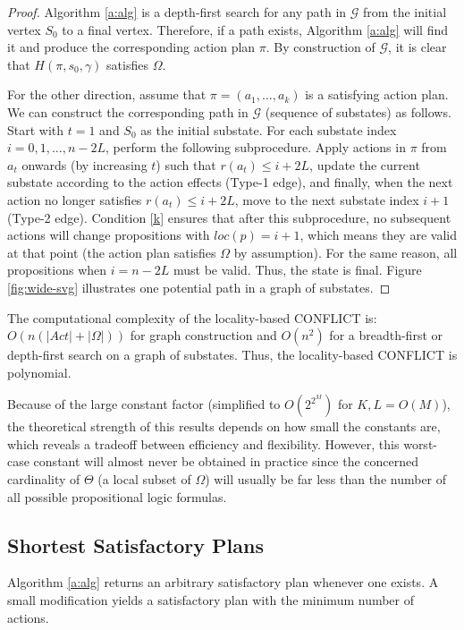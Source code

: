 \documentclass[]{jair}
\begin{document}
\begin{proof}{}
Algorithm \ref{a:alg} is a depth-first search for any path in $\mathcal{G}$ from the initial vertex $S_0$ to a final vertex. Therefore, if a path exists, Algorithm \ref{a:alg} will find it and produce the corresponding action plan $\pi$. By construction of $\mathcal{G}$, it is clear that $H(\pi, s_0, \gamma)$ satisfies $\Omega$.

For the other direction, assume that $\pi=(a_1,\dots,a_k)$ is a satisfying action plan. 
We can construct the corresponding path in $\mathcal{G}$ (sequence of substates) as follows.
Start with $t=1$ and $S_0$ as the initial substate. For each substate index $i=0,1,\dots,n-2L$, 
perform the following subprocedure. 
Apply actions in $\pi$ from $a_t$ onwards (by increasing $t$) such that $r(a_t)\le i + 2L$,
update the current substate according to the action effects (Type-1 edge), and finally, when the next action no longer satisfies $r(a_t)\le i+2L$, move to the next substate index $i+1$ (Type-2 edge).
Condition \eqref{k} ensures that after this subprocedure, no subsequent actions will change propositions
with $loc(p)=i+1$, which means they are valid at that point (the action plan satisfies $\Omega$ by assumption).
For the same reason, all propositions when $i=n-2L$ must be valid. Thus, the state is final. Figure \ref{fig:wide-svg} illustrates one potential path in a graph of substates.
\end{proof}

The computational complexity of the locality-based CONFLICT is: $O(n(|Act|+|\Omega|))$ for graph construction and $O(n^2)$ for a breadth-first or depth-first search on a graph of substates. Thus, the locality-based CONFLICT is polynomial.

Because of the large constant factor (simplified to $O(2^{2^M})$ for $K,L=O(M)$), the theoretical strength of this results depends on how small the constants are, which reveals a tradeoff between efficiency and flexibility.  However, this worst-case constant will almost never be obtained in practice since the concerned cardinality of $\Theta$ (a local subset of $\Omega$) will usually be far less than the number of all possible propositional logic formulas.

\subsection{Shortest Satisfactory Plans}\label{sp}

Algorithm \ref{a:alg} returns an arbitrary satisfactory plan whenever one exists.
A small modification yields a satisfactory plan with the minimum number of actions.
\end{document}
